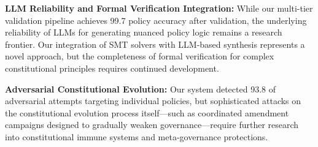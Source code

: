 \textbf{LLM Reliability and Formal Verification Integration:} While our multi-tier validation pipeline achieves 99.7\percent{} policy accuracy after validation, the underlying reliability of LLMs for generating nuanced policy logic remains a research frontier. Our integration of SMT solvers with LLM-based synthesis represents a novel approach, but the completeness of formal verification for complex constitutional principles requires continued development.

\textbf{Adversarial Constitutional Evolution:} Our system detected 93.8\percent{} of adversarial attempts targeting individual policies, but sophisticated attacks on the constitutional evolution process itself---such as coordinated amendment campaigns designed to gradually weaken governance---require further research into constitutional immune systems and meta-governance protections.
